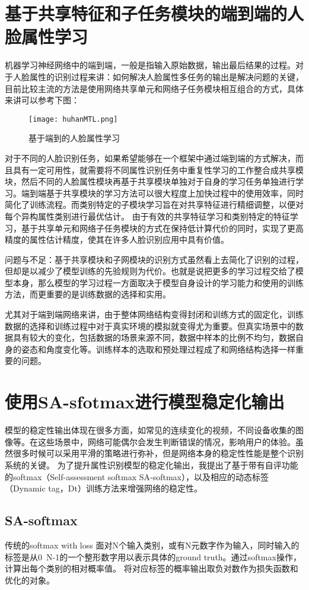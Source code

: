 \section{基于共享特征和子任务模块的端到端的人脸属性学习}
机器学习神经网络中的端到端，一般是指输入原始数据，输出最后结果的过程。对于人脸属性的识别过程来讲：如何解决人脸属性多任务的输出是解决问题的关键，目前比较主流的方法是使用网络共享单元和网络子任务模块相互组合的方式\cite{HUHAN_MTL}，具体来讲可以参考下图：
\begin{figure}[!ht]
 \centering
	\texttt{[image: huhanMTL.png]}
	\caption{基于端到的人脸属性学习}
\end{figure}
对于不同的人脸识别任务，如果希望能够在一个框架中通过端到端的方式解决，而且具有一定可用性，就需要将不同属性识别任务中重复性学习的工作整合成共享模块，然后不同的人脸属性模块再基于共享模块单独对于自身的学习任务单独进行学习。端到端基于共享模块的学习方法可以很大程度上加快过程中的使用效率，同时简化了训练流程。而类别特定的子模块学习旨在对共享特征进行精细调整，以便对每个异构属性类别进行最优估计。 由于有效的共享特征学习和类别特定的特征学习，基于共享单元和网络子任务模块的方式在保持低计算代价的同时，实现了更高精度的属性估计精度，使其在许多人脸识别应用中具有价值。

问题与不足：基于共享模块和子网模块的识别方式虽然看上去简化了识别的过程，但却是以减少了模型训练的先验规则为代价。也就是说把更多的学习过程交给了模型本身，那么模型的学习过程一方面取决于模型自身设计的学习能力和使用的训练方法，而更重要的是训练数据的选择和实用。

尤其对于端到端网络来讲，由于整体网络结构变得封闭和训练方式的固定化，训练数据的选择和训练过程中对于真实环境的模拟就变得尤为重要。但真实场景中的数据具有较大的变化，包括数据的场景来源不同，数据中样本的比例不均匀，数据自身的姿态和角度变化等。训练样本的选取和预处理过程成了和网络结构选择一样重要的问题。
\section{使用SA-sfotmax进行模型稳定化输出}
模型的稳定性输出体现在很多方面，如常见的连续变化的视频，不同设备收集的图像等。在这些场景中，网络可能偶尔会发生判断错误的情况，影响用户的体验。虽然很多时候可以采用平滑的策略进行弥补，但是网络本身的稳定性性能是整个识别系统的关键。
为了提升属性识别模型的稳定化输出，我提出了基于带有自评功能的softmax（Self-assessment softmax SA-softmax），以及相应的动态标签（Dynamic tag，Dt）训练方法来增强网络的稳定性。
\subsection{SA-softmax}
传统的softmax with loss 面对N个输入类别，或有N元数字作为输入，同时输入的标签是从0~N-1的一个整形数字用以表示具体的ground truth。通过softmax操作，计算出每个类别的相对概率值。
将对应标签的概率输出取负对数作为损失函数和优化的对象。

